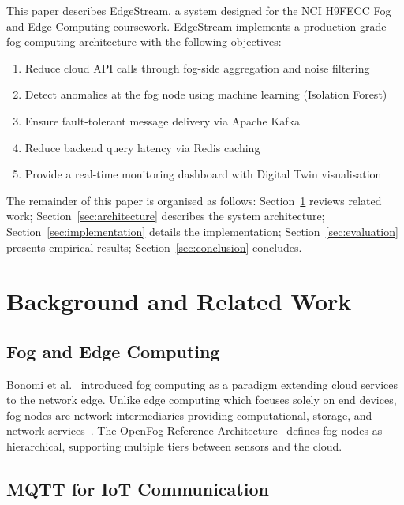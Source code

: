 \documentclass[conference]{IEEEtran}
\begin{document}
This paper describes EdgeStream, a system designed for the NCI H9FECC Fog and Edge Computing coursework. EdgeStream implements a production-grade fog computing architecture with the following objectives:

\begin{enumerate}
    \item Reduce cloud API calls through fog-side aggregation and noise filtering
    \item Detect anomalies at the fog node using machine learning (Isolation Forest)
    \item Ensure fault-tolerant message delivery via Apache Kafka
    \item Reduce backend query latency via Redis caching
    \item Provide a real-time monitoring dashboard with Digital Twin visualisation
\end{enumerate}

The remainder of this paper is organised as follows: Section~\ref{sec:background} reviews related work; Section~\ref{sec:architecture} describes the system architecture; Section~\ref{sec:implementation} details the implementation; Section~\ref{sec:evaluation} presents empirical results; Section~\ref{sec:conclusion} concludes.

\section{Background and Related Work}
\label{sec:background}

\subsection{Fog and Edge Computing}

Bonomi et al.~\cite{bonomi2012fog} introduced fog computing as a paradigm extending cloud services to the network edge. Unlike edge computing which focuses solely on end devices, fog nodes are network intermediaries providing computational, storage, and network services~\cite{shi2016edge}. The OpenFog Reference Architecture~\cite{openfog2017} defines fog nodes as hierarchical, supporting multiple tiers between sensors and the cloud.

\subsection{MQTT for IoT Communication}
\end{document}
